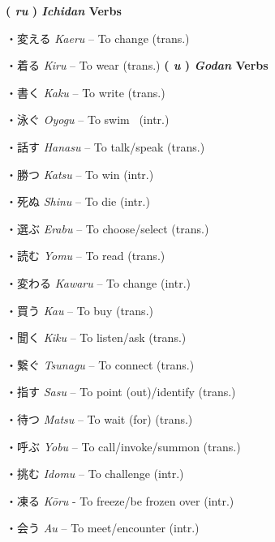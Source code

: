 \par{\textbf{( \emph{ru }) \emph{Ichidan }Verbs }}
 
\par{・変える \emph{Kaeru }– To change (trans.) }
 
\par{・着る \emph{Kiru }– To wear (trans.) }
\hfill\break
  \textbf{( \emph{u }) \emph{Godan }Verbs }
\par{・書く \emph{Kaku }– To write (trans.) }

\par{・泳ぐ \emph{Oyogu }– To swim  (intr.) }

\par{・話す \emph{Hanasu }– To talk\slash speak (trans.) }

\par{・勝つ \emph{Katsu }– To win (intr.) }

\par{・死ぬ \emph{Shinu }– To die (intr.) }

\par{・選ぶ \emph{Erabu }– To choose\slash select (trans.) }

\par{・読む \emph{Yomu }– To read (trans.) }

\par{・変わる \emph{Kawaru }– To change (intr.) }

\par{・買う \emph{Kau }– To buy (trans.) }

\par{・聞く \emph{Kiku }– To listen\slash ask (trans.) }

\par{・繋ぐ \emph{Tsunagu }– To connect (trans.) }

\par{・指す \emph{Sasu }– To point (out)\slash identify (trans.) }

\par{・待つ \emph{Matsu }– To wait (for) (trans.) }

\par{・呼ぶ \emph{Yobu }– To call\slash invoke\slash summon (trans.) }

\par{・挑む \emph{Idomu }– To challenge (intr.) }

\par{・凍る \emph{Kōru }- To freeze\slash be frozen over (intr.) }

\par{・会う \emph{Au }– To meet\slash encounter (intr.) }

